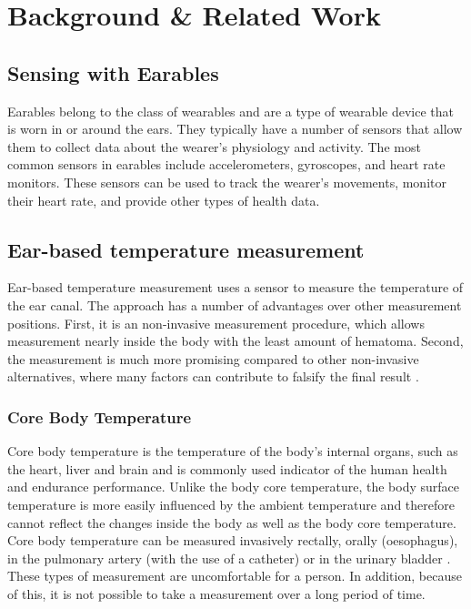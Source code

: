 
\chapter{Background \& Related Work}
\label{ch:Background}

\section{Sensing with Earables}
Earables belong to the class of wearables and are a type of wearable device that is worn in or around the ears. 
They typically have a number of sensors that allow them to collect data about the wearer's physiology and activity. 
The most common sensors in earables include accelerometers, gyroscopes, and heart rate monitors. These sensors can be used to track the wearer's movements, monitor their heart rate, and provide other types of health data.

\section{Ear-based temperature measurement}
Ear-based temperature measurement uses a sensor to measure the temperature of the ear canal. 
The approach has a number of advantages over other measurement positions.
First, it is an non-invasive measurement procedure, which allows measurement nearly inside the body with the least amount of hematoma.
Second, the measurement is much more promising compared to other non-invasive alternatives, where many factors can contribute to falsify the final result \cite{asdf}. %

\subsection{Core Body Temperature}
Core body temperature is the temperature of the body's internal organs, such as the heart, liver and brain and is commonly used indicator of the human health and endurance performance.
Unlike the body core temperature, the body surface temperature is more easily influenced by the ambient temperature and therefore cannot reflect the changes inside the body as well as the body core temperature.
Core body temperature can be measured invasively rectally, orally (oesophagus), in the pulmonary artery (with the use of a catheter) or in the urinary bladder \cite{moranCoreTemperatureMeasurement2002a}. 
These types of measurement are uncomfortable for a person. 
In addition, because of this, it is not possible to take a measurement over a long period of time.

